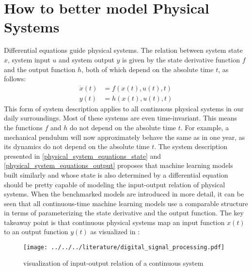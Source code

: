 \documentclass[draft,final]{vutinfth} %
\begin{document}
    \section{How to better model Physical Systems} \label{physical_systems}
    Differential equations guide physical systems. The relation between system state $x$, system input $u$ and system output $y$ is given by the state derivative function $f$ and the output function $h$, both of which depend on the absolute time $t$, as follows:
    \begin{align}
        \label{physical_system_equations_state}
        \dot x(t) &= f(x(t),u(t),t) \\
        \label{physical_system_equations_output}
        y(t) &= h(x(t),u(t),t)
    \end{align}
    This form of system description applies to all continuous physical systems in our daily surroundings. Most of these systems are even time-invariant.
    This means the functions $f$ and $h$ do not depend on the absolute time $t$.
    For example, a mechanical pendulum will now approximately behave the same as in one year, as its dynamics do not depend on the absolute time $t$.
    The system description presented in \ref{physical_system_equations_state} and \ref{physical_system_equations_output} proposes that machine learning models built similarly and whose state is also determined by a differential equation should be pretty capable of modeling the input-output relation of physical systems.
    When the benchmarked models are introduced in more detail, it can be seen that all continuous-time machine learning models use a comparable structure in terms of parameterizing the state derivative and the output function.
    The key takeaway point is that continuous physical systems map an input function $x(t)$ to an output function $y(t)$ as visualized in \cite[p. 102]{dsp}:
    \begin{figure}[H]
        \centering{}
        \texttt{[image: ../../../literature/digital\_signal\_processing.pdf]}
        \caption{visualization of input-output relation of a continuous system}
        \label{fig:continuous_system_vis}
    \end{figure}
\end{document}

